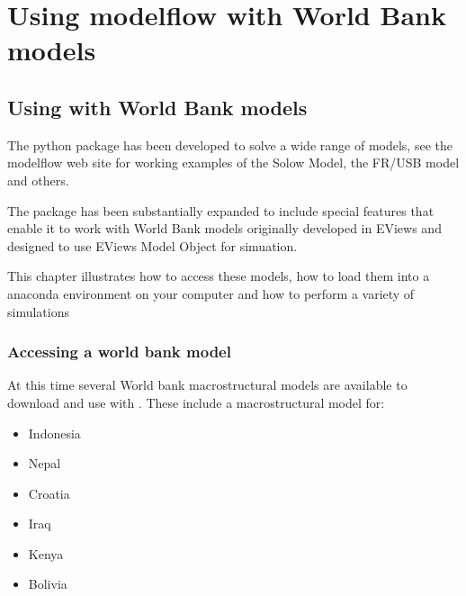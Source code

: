 \documentclass[letterpaper,10pt,english]{jupyterBook}
\begin{document}
\part{Using modelflow with World Bank models}

\sphinxstepscope


\chapter{Using  with World Bank models}
\label{\detokenize{content/06_WBModels/LoadingWBModel:using-modelflow-with-world-bank-models}}\label{\detokenize{content/06_WBModels/LoadingWBModel::doc}}
\sphinxAtStartPar
The  python package has been developed to solve a wide range of models, see the modelflow  web site for working examples of the Solow Model, the FR/USB model and others.

\sphinxAtStartPar
The package has been substantially expanded to include special features that enable it to work with World Bank models originally developed in EViews and designed to use EViews Model Object for simuation.

\sphinxAtStartPar
This chapter illustrates how to access these models, how to load them into a  anaconda environment on your computer and how to perform a variety of simulations


\section{Accessing a world bank model}
\label{\detokenize{content/06_WBModels/LoadingWBModel:accessing-a-world-bank-model}}
\sphinxAtStartPar
At this time several World bank macrostructural models are available to download and use with .  These include a macrostructural model for:
\begin{itemize}
\item {} 
\sphinxAtStartPar
Indonesia

\item {} 
\sphinxAtStartPar
Nepal

\item {} 
\sphinxAtStartPar
Croatia

\item {} 
\sphinxAtStartPar
Iraq

\item {} 
\sphinxAtStartPar
Kenya

\item {} 
\sphinxAtStartPar
Bolivia

\end{itemize}
\end{document}

